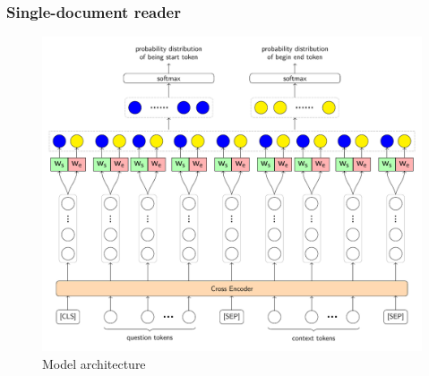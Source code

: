 \documentclass[11pt]{beamer}
\begin{document}
\begin{frame}
\frametitle{Single-document reader}
\vspace*{-10pt}
\begin{figure}[h]
	\includegraphics[scale=.45]{images/PDF/singleDocReader/singleDocReader.pdf}
	\caption{Model architecture}
\end{figure}
\end{frame}
\end{document}
